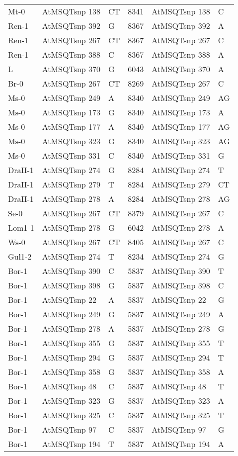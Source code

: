 \begin{center}
\begin{longtable}{|l|l|l|l|l|l|}
Mt-0&AtMSQTsnp 138&CT&8341&AtMSQTsnp 138&C\\
Ren-1&AtMSQTsnp 392&G&8367&AtMSQTsnp 392&A\\
Ren-1&AtMSQTsnp 267&CT&8367&AtMSQTsnp 267&C\\
Ren-1&AtMSQTsnp 388&C&8367&AtMSQTsnp 388&A\\
L&AtMSQTsnp 370&G&6043&AtMSQTsnp 370&A\\
Br-0&AtMSQTsnp 267&CT&8269&AtMSQTsnp 267&C\\
Ms-0&AtMSQTsnp 249&A&8340&AtMSQTsnp 249&AG\\
Ms-0&AtMSQTsnp 173&G&8340&AtMSQTsnp 173&A\\
Ms-0&AtMSQTsnp 177&A&8340&AtMSQTsnp 177&AG\\
Ms-0&AtMSQTsnp 323&G&8340&AtMSQTsnp 323&AG\\
Ms-0&AtMSQTsnp 331&C&8340&AtMSQTsnp 331&G\\
DraII-1&AtMSQTsnp 274&G&8284&AtMSQTsnp 274&T\\
DraII-1&AtMSQTsnp 279&T&8284&AtMSQTsnp 279&CT\\
DraII-1&AtMSQTsnp 278&A&8284&AtMSQTsnp 278&AG\\
Se-0&AtMSQTsnp 267&CT&8379&AtMSQTsnp 267&C\\
Lom1-1&AtMSQTsnp 278&G&6042&AtMSQTsnp 278&A\\
Ws-0&AtMSQTsnp 267&CT&8405&AtMSQTsnp 267&C\\
Gul1-2&AtMSQTsnp 274&T&8234&AtMSQTsnp 274&G\\
Bor-1&AtMSQTsnp 390&C&5837&AtMSQTsnp 390&T\\
Bor-1&AtMSQTsnp 398&G&5837&AtMSQTsnp 398&C\\
Bor-1&AtMSQTsnp 22&A&5837&AtMSQTsnp 22&G\\
Bor-1&AtMSQTsnp 249&G&5837&AtMSQTsnp 249&A\\
Bor-1&AtMSQTsnp 278&A&5837&AtMSQTsnp 278&G\\
Bor-1&AtMSQTsnp 355&G&5837&AtMSQTsnp 355&T\\
Bor-1&AtMSQTsnp 294&G&5837&AtMSQTsnp 294&T\\
Bor-1&AtMSQTsnp 358&G&5837&AtMSQTsnp 358&A\\
Bor-1&AtMSQTsnp 48&C&5837&AtMSQTsnp 48&T\\
Bor-1&AtMSQTsnp 323&G&5837&AtMSQTsnp 323&A\\
Bor-1&AtMSQTsnp 325&C&5837&AtMSQTsnp 325&T\\
Bor-1&AtMSQTsnp 97&C&5837&AtMSQTsnp 97&G\\
Bor-1&AtMSQTsnp 194&T&5837&AtMSQTsnp 194&A\\

\end{longtable}
\end{center}
